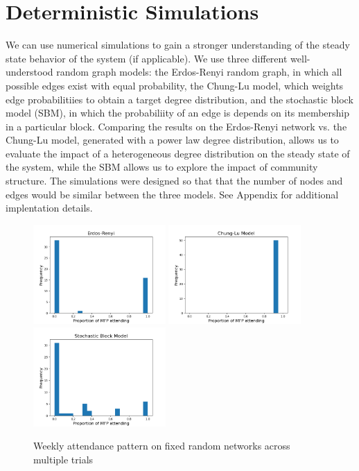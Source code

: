 \documentclass[12pt]{article}
\begin{document}
\section{Deterministic Simulations}
We can use numerical simulations to gain a stronger understanding of the steady state behavior of the system (if applicable).  We use three different well-understood random graph models: the Erdos-Renyi random graph, in which all possible edges exist with equal probability, the Chung-Lu model, which weights edge probabilitiies to obtain a target degree distribution, and the stochastic block model (SBM), in which the probabiliity of an edge is depends on its membership in a particular block.  Comparing the results on the Erdos-Renyi network vs. the Chung-Lu model, generated with a power law degree distribution, allows us to evaluate the impact of a heterogeneous degree distribution on the steady state of the system, while the SBM allows us to explore the impact of community structure.  The simulations were designed so that that the number of nodes and edges would be similar between the three models.  See Appendix for additional implentation details.

\begin{figure}[h!]
  \includegraphics[width=0.45\textwidth]{gnp_attendance.png}
  \includegraphics[width=0.45\textwidth]{cm_attendance.png}
  \includegraphics[width=0.45\textwidth]{sbm_attendance.png}
  \caption{Weekly attendance pattern on fixed random networks across multiple trials}
\end{figure}
\end{document}
